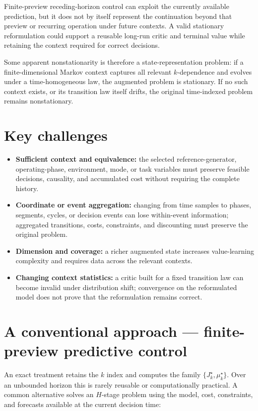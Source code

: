 \documentclass[a4paper]{article}
\begin{document}
Finite-preview receding-horizon control can exploit the currently available
prediction, but it does not by itself represent the continuation beyond that
preview or recurring operation under future contexts. A valid stationary
reformulation could support a reusable long-run critic and terminal value
while retaining the context required for correct decisions.

Some apparent nonstationarity is therefore a state-representation problem: if
a finite-dimensional Markov context captures all relevant $k$-dependence and
evolves under a time-homogeneous law, the augmented problem is stationary. If
no such context exists, or its transition law itself drifts, the original
time-indexed problem remains nonstationary.

\section{Key challenges}

\begin{itemize}
  \item \textbf{Sufficient context and equivalence:} the selected
  reference-generator, operating-phase, environment, mode, or task variables
  must preserve feasible decisions, causality, and accumulated cost without
  requiring the complete history.
  \item \textbf{Coordinate or event aggregation:} changing from time samples
  to phases, segments, cycles, or decision events can lose within-event
  information; aggregated transitions, costs, constraints, and discounting
  must preserve the original problem.
  \item \textbf{Dimension and coverage:} a richer augmented state increases
  value-learning complexity and requires data across the relevant contexts.
  \item \textbf{Changing context statistics:} a critic built for a fixed
  transition law can become invalid under distribution shift; convergence on
  the reformulated model does not prove that the reformulation remains
  correct.
\end{itemize}

\section{A conventional approach — finite-preview predictive control}

An exact treatment retains the $k$ index and computes the family
$\{J_k^\star,\mu_k^\star\}$. Over an unbounded horizon this is rarely reusable
or computationally practical. A common alternative solves an $H$-stage
problem using the model, cost, constraints, and forecasts available at the
current decision time:
\end{document}
